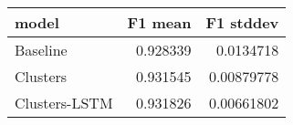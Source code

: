 \begin{tabular}{lrr}
\toprule
 model         &   F1 mean &   F1 stddev \\
\midrule
 Baseline      &  0.928339 &  0.0134718  \\
 Clusters      &  0.931545 &  0.00879778 \\
 Clusters-LSTM &  0.931826 &  0.00661802 \\
\bottomrule
\end{tabular}